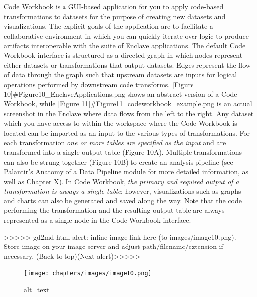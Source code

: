 \documentclass[
  letterpaper,
  DIV=11,
  numbers=noendperiod]{scrreprt}
\begin{document}
Code Workbook is a GUI-based application for you to apply code-based
transformations to datasets for the purpose of creating new datasets and
visualizations. The explicit goals of the application are to facilitate
a collaborative environment in which you can quickly iterate over logic
to produce artifacts interoperable with the suite of Enclave
applications. The default Code Workbook interface is structured as a
directed graph in which nodes represent either datasets or
transformations that output datasets. Edges represent the flow of data
through the graph such that upstream datasets are inputs for logical
operations performed by downstream code transforms. {[}Figure
10{]}\#Figure10\_EnclaveApplications.png shows an abstract version of a
Code Workbook, while {[}Figure
11{]}\#Figure11\_codeworkbook\_example.png is an actual screenshot in
the Enclave where data flows from the left to the right. Any dataset
which you have access to within the workspace where the Code Workbook is
located can be imported as an input to the various types of
transformations. For each transformation \emph{{one or more tables are
specified as the input}} and are transformed into a single output table
(Figure 10A). Multiple transformations can also be strung together
(Figure 10B) to create an analysis pipeline (see Palantir's
\href{https://www.palantir.com/docs/foundry/building-pipelines/overview/}{Anatomy
of a Data Pipeline} module for more detailed information, as well as
Chapter
\protect\hyperlink{Best-Practices-and-Important-Data-Considerations}{X}).
In Code Workbook, \emph{{the primary and required output of a
transformation is always a single table}}; however, visualizations such
as graphs and charts can also be generated and saved along the way. Note
that the code performing the transformation and the resulting output
table are always represented as a single node in the Code Workbook
interface.

{\textgreater\textgreater\textgreater\textgreater\textgreater{}
gd2md-html alert: inline image link here (to images/image10.png). Store
image on your image server and adjust path/filename/extension if
necessary. }(Back to top)(Next
alert){\textgreater\textgreater\textgreater\textgreater\textgreater{} }

\begin{figure}

{\centering \texttt{[image: chapters/images/image10.png]}

}

\caption{alt\_text}

\end{figure}
\end{document}
